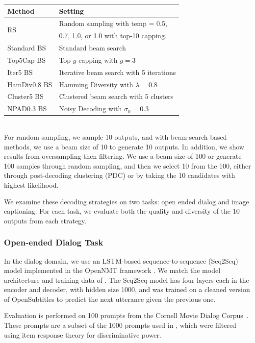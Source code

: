 \small
\begin{tabular}{l|l}
    \toprule
    Method & Setting\\
    \midrule
    \multirow{2}{*}{RS} & Random sampling with temp = 0.5,\\
    & 0.7, 1.0, or 1.0 with top-10 capping.\\
    Standard BS & Standard beam search\\
    Top5Cap BS & Top-$g$ capping with $g=3$\\
    Iter5 BS & Iterative beam search with 5 iterations\\
    HamDiv0.8 BS & Hamming Diversity with $\lambda=0.8$\\
    Cluster5 BS & Clustered beam search with 5 clusters\\
    NPAD0.3 BS & Noisy Decoding with $\sigma_0=0.3$ \\
    \bottomrule
\end{tabular}
\normalsize
\\

For random sampling, we sample 10 outputs, and with beam-search based methods, we use a beam size of 10 to generate 10 outputs.
In addition, we show results from oversampling then filtering.
We use a beam size of 100 or generate 100 samples through random sampling, and then we select 10 from the 100, either through post-decoding clustering (PDC) or by taking the 10 candidates with highest likelihood. 

We examine these decoding strategies on two tasks: open ended dialog and image captioning.
For each task, we evaluate both the quality and diversity of the 10 outputs from each strategy.

\subsubsection{Open-ended Dialog Task}
In the dialog domain, we use an LSTM-based sequence-to-sequence (Seq2Seq) model implemented in the OpenNMT framework \cite{opennmt}.
We match the model architecture and training data of \citet{baheti2018generating}.
The Seq2Seq model has four layers each in the encoder and decoder, with hidden size 1000, and was trained on a cleaned version of OpenSubtitles \cite{tiedemann2009news} to predict the next utterance given the previous one.

Evaluation is performed on 100 prompts from the Cornell Movie Dialog Corpus~\cite{danescu2011chameleons}.
These prompts are a subset of the 1000 prompts used in \citet{baheti2018generating}, which were filtered using item response theory for discriminative power.

